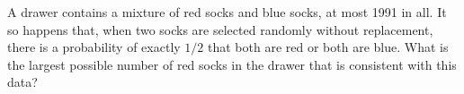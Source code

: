 A drawer contains a mixture of red socks and blue socks, at most 1991 in all. It so happens that, when two socks are selected randomly without replacement, there is a probability of exactly $1/2$ that both are red or both are blue. What is the largest possible number of red socks in the drawer that is consistent with this data?